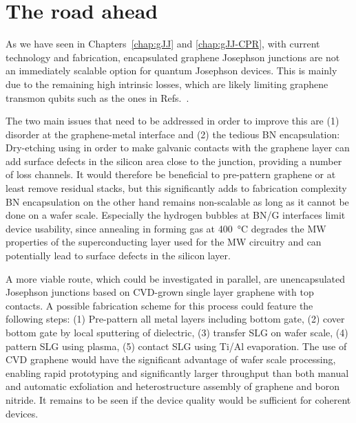 \section{The road ahead}



As we have seen in Chapters~\ref{chap:gJJ} and \ref{chap:gJJ-CPR}, with current technology and fabrication, encapsulated graphene Josephson junctions are not an immediately scalable option for quantum Josephson devices.
%
This is mainly due to the remaining high intrinsic losses, which are likely limiting graphene transmon qubits such as the ones in Refs.~\cite{krollMagneticFieldCompatible2018,wangCoherentControlHybrid2019}.

The two main issues that need to be addressed in order to improve this are (1) disorder at the graphene-metal interface and (2) the tedious BN encapsulation:
Dry-etching using  in order to make galvanic contacts with the graphene layer can add surface defects in the silicon area close to the junction, providing a number of loss channels.
%
It would therefore be beneficial to pre-pattern graphene or at least remove residual stacks, but this significantly adds to fabrication complexity
%
BN encapsulation on the other hand remains non-scalable as long as it cannot be done on a wafer scale.
%
Especially the hydrogen bubbles at BN/G interfaces limit device usability, since annealing in forming gas at \SI{400}{\celsius} degrades the MW properties of the superconducting layer used for the MW circuitry and can potentially lead to surface defects in the silicon layer.

A more viable route, which could be investigated in parallel, are unencapsulated Josephson junctions based on CVD-grown single layer graphene with top contacts.
%
A possible fabrication scheme for this process could feature the following steps:
%
(1) Pre-pattern all metal layers including bottom gate, (2) cover bottom gate by local sputtering of dielectric, (3) transfer SLG on wafer scale, (4) pattern SLG using  plasma, (5) contact SLG using Ti/Al evaporation.
%
The use of CVD graphene would have the significant advantage of wafer scale processing, enabling rapid prototyping and significantly larger throughput than both manual and automatic exfoliation and heterostructure assembly of graphene and boron nitride.
%
It remains to be seen if the device quality would be sufficient for coherent devices.

